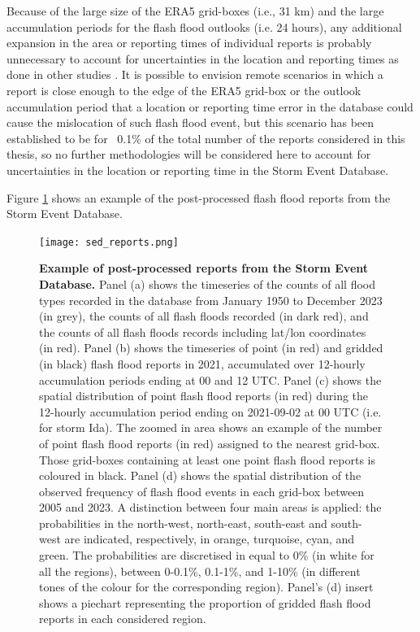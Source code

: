 Because of the large size of the ERA5 grid-boxes (i.e., 31 km) and the large accumulation periods for the flash flood outlooks (i.e. 24 hours), any additional expansion in the area or reporting times of individual reports is probably unnecessary to account for uncertainties in the location and reporting times as done in other studies \citep{Cavaiola_2024}. It is possible to envision remote scenarios in which a report is close enough to the edge of the ERA5 grid-box or the outlook accumulation period that a location or reporting time error in the database could cause the mislocation of such flash flood event, but this scenario has been established to be for ~0.1\% of the total number of the reports considered in this thesis, so no further methodologies will be considered here to account for uncertainties in the location or reporting time in the Storm Event Database. 

Figure \ref{fig:sed_reports} shows an example of the post-processed flash flood reports from the Storm Event Database.

\begin{figure}[htbp]
\centering
\texttt{[image: sed\_reports.png]}
\caption{\textbf{Example of post-processed reports from the Storm Event Database.} Panel (a) shows the timeseries of the counts of all flood types recorded in the database from January 1950 to December 2023 (in grey), the counts of all flash floods recorded (in dark red), and the counts of all flash floods records including lat/lon coordinates (in red). Panel (b) shows the timeseries of point (in red) and gridded (in black) flash flood reports in 2021, accumulated over 12-hourly accumulation periods ending at 00 and 12 UTC. Panel (c) shows the spatial distribution of point flash flood reports (in red) during the 12-hourly accumulation period ending on 2021-09-02 at 00 UTC (i.e. for storm Ida). The zoomed in area shows an example of the number of point flash flood reports (in red) assigned to the nearest grid-box. Those grid-boxes containing at least one point flash flood reports is coloured in black. Panel (d) shows the spatial distribution of the observed frequency of flash flood events in each grid-box between 2005 and 2023. A distinction between four main areas is applied: the probabilities in the north-west, north-east, south-east and south-west are indicated, respectively, in orange, turquoise, cyan, and green. The probabilities are discretised in equal to 0\% (in white for all the regions), between 0-0.1\%, 0.1-1\%, and 1-10\% (in different tones of the colour for the corresponding region). Panel’s (d) insert shows a piechart representing the proportion of gridded flash flood reports in each considered region.}
\label{fig:sed_reports}
\end{figure}


